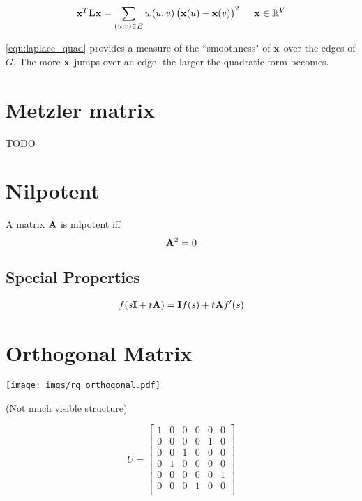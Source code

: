 \begin{align}
\mathbf{x}^T \mathbf{L} \mathbf{x} = \sum_{(u,v)\in E} w(u,v) \left(\mathbf{x}(u)-\mathbf{x}(v)\right)^2~~~~\mathbf{x}\in\mathbb{R}^{V} \label{equ:laplace_quad}
\end{align}

\autoref{equ:laplace_quad} provides a measure of the ``smoothness" of $\mathbf{x}$ over the edges of $G$. The more $\mathbf{x}$ jumps over an edge, the larger the quadratic form becomes.


\section{Metzler matrix}
TODO

\section{Nilpotent}
\label{sec:rogue:nilpotent}
A matrix $\mathbf{A}$ is nilpotent iff
\begin{equation}
\mathbf{A}^2=0
\end{equation}

\subsection*{Special Properties}
\begin{align}
  f(s\mathbf{I}+t\mathbf{A}) = \mathbf{I} f(s) + t \mathbf{A} f'(s)
\end{align}



\section{Orthogonal Matrix}

\begin{center}
\texttt{[image: imgs/rg\_orthogonal.pdf]}

(Not much visible structure)
\end{center}


\begin{equation}
U=
\begin{bmatrix}
1 & 0 & 0 & 0 & 0 & 0 \\
0 & 0 & 0 & 0 & 1 & 0 \\
0 & 0 & 1 & 0 & 0 & 0 \\
0 & 1 & 0 & 0 & 0 & 0 \\
0 & 0 & 0 & 0 & 0 & 1 \\
0 & 0 & 0 & 1 & 0 & 0 \\
\end{bmatrix}
\end{equation}

